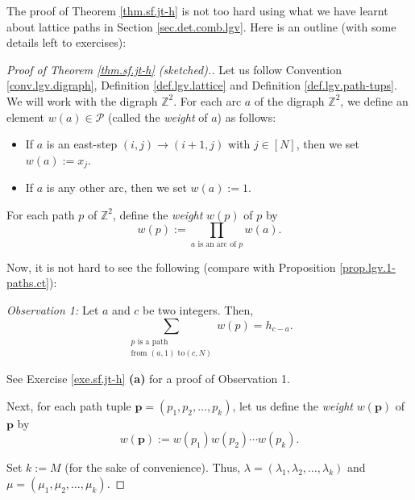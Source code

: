 The proof of Theorem \ref{thm.sf.jt-h} is not too hard using what we have
learnt about lattice paths in Section \ref{sec.det.comb.lgv}. Here is an
outline (with some details left to exercises):

\begin{proof}
[Proof of Theorem \ref{thm.sf.jt-h} (sketched).]Let us follow Convention
\ref{conv.lgv.digraph}, Definition \ref{def.lgv.lattice} and Definition
\ref{def.lgv.path-tups}. We will work with the digraph $\mathbb{Z}^{2}$. For
each arc $a$ of the digraph $\mathbb{Z}^{2}$, we define an element $w\left(
a\right)  \in\mathcal{P}$ (called the \emph{weight} of $a$) as follows:

\begin{itemize}
\item If $a$ is an east-step $\left(  i,j\right)  \rightarrow\left(
i+1,j\right)  $ with $j\in\left[  N\right]  $, then we set $w\left(  a\right)
:=x_{j}$.

\item If $a$ is any other arc, then we set $w\left(  a\right)  :=1$.
\end{itemize}

For each path $p$ of $\mathbb{Z}^{2}$, define the \emph{weight} $w\left(
p\right)  $ of $p$ by%
\[
w\left(  p\right)  :=\prod_{a\text{ is an arc of }p}w\left(  a\right)  .
\]


Now, it is not hard to see the following (compare with Proposition
\ref{prop.lgv.1-paths.ct}):

\begin{statement}
\textit{Observation 1:} Let $a$ and $c$ be two integers. Then,%
\[
\sum_{\substack{p\text{ is a path}\\\text{from }\left(  a,1\right)  \text{ to
}\left(  c,N\right)  }}w\left(  p\right)  =h_{c-a}.
\]

\end{statement}

See Exercise \ref{exe.sf.jt-h} \textbf{(a)} for a proof of Observation 1.

Next, for each path tuple $\mathbf{p}=\left(  p_{1},p_{2},\ldots,p_{k}\right)
$, let us define the \emph{weight} $w\left(  \mathbf{p}\right)  $ of
$\mathbf{p}$ by%
\[
w\left(  \mathbf{p}\right)  :=w\left(  p_{1}\right)  w\left(  p_{2}\right)
\cdots w\left(  p_{k}\right)  .
\]


Set $k:=M$ (for the sake of convenience). Thus, $\lambda=\left(  \lambda
_{1},\lambda_{2},\ldots,\lambda_{k}\right)  $ and $\mu=\left(  \mu_{1},\mu
_{2},\ldots,\mu_{k}\right)  $.


\end{proof}
